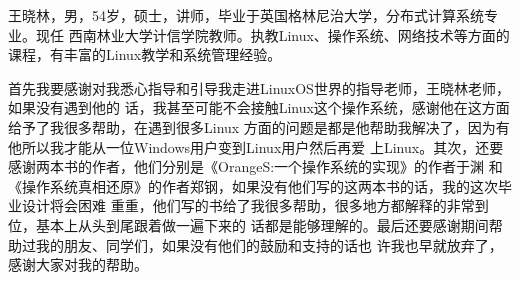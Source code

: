 \documentclass{swfuthesis}
\begin{document}
\mainmatter


\appendix %
\makebib %

\begin{advisorInfo} %
  王晓林，男，54岁，硕士，讲师，毕业于英国格林尼治大学，分布式计算系统专业。现任
  西南林业大学计信学院教师。执教Linux、操作系统、网络技术等方面的课程，有丰富的Linux教学和系统管理经验。
\end{advisorInfo}

\begin{acknowledgment} %
  首先我要感谢对我悉心指导和引导我走进LinuxOS世界的指导老师，王晓林老师，如果没有遇到他的
  话，我甚至可能不会接触Linux这个操作系统，感谢他在这方面给予了我很多帮助，在遇到很多Linux
  方面的问题是都是他帮助我解决了，因为有他所以我才能从一位Windows用户变到Linux用户然后再爱
  上Linux。其次，还要感谢两本书的作者，他们分别是《OrangeS:一个操作系统的实现》的作者于渊
  和《操作系统真相还原》的作者郑钢，如果没有他们写的这两本书的话，我的这次毕业设计将会困难
  重重，他们写的书给了我很多帮助，很多地方都解释的非常到位，基本上从头到尾跟着做一遍下来的
  话都是能够理解的。最后还要感谢期间帮助过我的朋友、同学们，如果没有他们的鼓励和支持的话也
  许我也早就放弃了，感谢大家对我的帮助。
\end{acknowledgment}

\singlespacing


\end{document}
